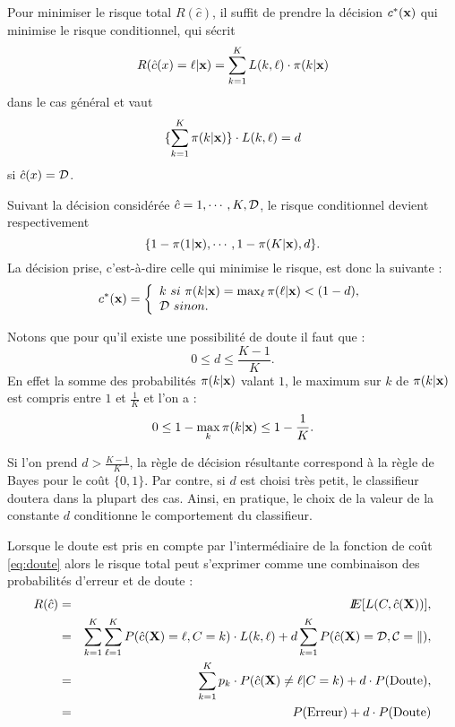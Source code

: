 Pour minimiser le risque total $R(\hat{c})$, il suffit de prendre la d\'ecision 
$c^*(\mbox{\bf x})$ qui  minimise le risque conditionnel, qui s\'ecrit 
$$ 
R(\hat{c}(x)=\ell |\mbox{\bf x}) = \sum_{k=1}^{K} L(k,\ell)\cdot \pi(k | \mbox{\bf x})
$$
dans le cas g\'en\'eral et vaut 
$$
\{\sum_{k=1}^{K}\pi(k | \mbox{\bf x})\}\cdot  L(k,\ell)= d
$$
si $\hat{c}(x)={\cal D}$.

Suivant  la d\'ecision consid\'er\'ee $\hat{c}={1,\cdots,K,{\cal D}}$, le risque 
conditionnel devient respectivement
$$
\{ 1 - \pi(1|\mbox{\bf x}), \cdots, 1 - \pi(K|\mbox{\bf x}), d  \}.
$$
La d\'ecision prise, c'est-\`a-dire celle qui minimise le risque,  est donc la suivante :
$$
c^*(\mbox{\bf x})=
\left \{ \begin{array}{l}
k \ si \ \pi(k | \mbox{\bf x})=\max_{\ell} \pi(\ell | \mbox{\bf x}) < (1-d), \\
{\cal D} \ sinon.\\
\end{array}
\right .
$$

Notons que pour  qu'il existe une possibilit\'e de doute il faut que :
$$
0 \leq d \leq \frac{K-1}{K}.
$$
En effet la somme des probabilit\'es $\pi(k|\mbox{\bf x})$ valant $1$, le maximum sur $k$ de 
$\pi(k|\mbox{\bf x})$ est compris entre $1$ et $\frac{1}{K}$ et l'on a :
$$
0 \leq 1 - \max_k \pi(k|\mbox{\bf x}) \leq 1 - \frac{1}{K}.
$$

Si l'on prend $d>\frac{K-1}{K}$, la r\`egle de d\'ecision 
r\'esultante correspond \`a la r\`egle de Bayes pour le co\^ut $\{0,1\}$.
Par contre, si $d$ est choisi tr\`es petit, le classifieur doutera
dans la plupart des cas. Ainsi, en pratique, le choix de la valeur 
de la constante $d$ conditionne le comportement du classifieur.


Lorsque le doute est pris en compte par l'interm\'ediaire de la fonction
de co\^ut \ref{eq:doute} alors le risque total peut s'exprimer comme
une combinaison des probabilit\'es d'erreur et de doute :
\begin{eqnarray*}
R(\hat{c}) &  =   & I\!\!E[ L(C,\hat{c}(\mbox{\bf X}))], \\
& =    &  \sum_{k=1}^K  \sum_{\ell=1}^K P(\hat{c}(\mbox{\bf X}) = \ell , C=k)\cdot L(k,\ell) + d\sum_{k=1}^K P(\hat{c}(\mbox{\bf X}) = \cal{D} , C=k),\\
& =    & \sum_{k=1}^K   p_k \cdot P(\hat{c}(\mbox{\bf X}) \neq \ell | C=k) + d \cdot P(\mbox{Doute}),\\
& =    & P(\mbox{Erreur}) + d \cdot P(\mbox{Doute})
\end{eqnarray*}

